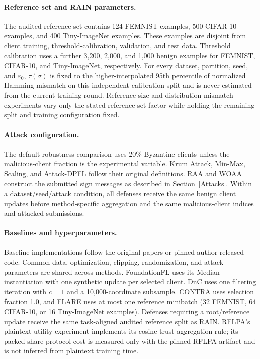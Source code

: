 \paragraph{Reference set and RAIN parameters.}
The audited reference set contains 124 FEMNIST examples, 500 CIFAR-10 examples,
and 400 Tiny-ImageNet examples. These examples are disjoint from client
training, threshold-calibration, validation, and test data. Threshold
calibration uses a further 3,200, 2,000, and 1,000 benign examples for FEMNIST,
CIFAR-10, and Tiny-ImageNet, respectively. For every dataset, partition, seed,
and $\varepsilon_0$, $\tau(\sigma)$ is fixed to the higher-interpolated 95th
percentile of normalized Hamming mismatch on this independent calibration
split and is never estimated from the current training round. Reference-size
and distribution-mismatch experiments vary only the stated reference-set
factor while holding the remaining split and training configuration fixed.

\paragraph{Attack configuration.}
The default robustness comparison uses 20\% Byzantine clients unless the
malicious-client fraction is the experimental variable. Krum Attack, Min-Max,
Scaling, and Attack-DPFL follow their original definitions. RAA and WOAA
construct the submitted sign messages as described in
Section~\ref{Attacks}. Within a dataset/seed/attack condition, all defenses
receive the same benign client updates before method-specific aggregation and
the same malicious-client indices and attacked submissions.

\paragraph{Baselines and hyperparameters.}
Baseline implementations follow the original papers or pinned author-released
code. Common data, optimization, clipping, randomization, and attack parameters
are shared across methods. FoundationFL uses its Median instantiation with one
synthetic update per selected client. DnC uses one filtering iteration with
$c=1$ and a 10,000-coordinate subsample. CONTRA uses selection fraction 1.0,
and FLARE uses at most one reference minibatch (32 FEMNIST, 64 CIFAR-10, or 16
Tiny-ImageNet examples). Defenses requiring a root/reference update receive the
same task-aligned audited reference split as RAIN. RFLPA's plaintext utility
experiment implements its cosine-trust aggregation rule; its packed-share
protocol cost is measured only with the pinned RFLPA artifact and is not
inferred from plaintext training time.

